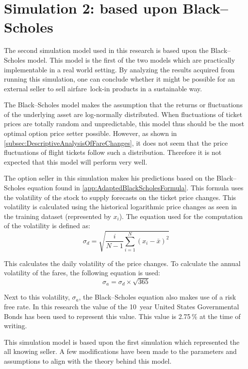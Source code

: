 

\section{Simulation 2: based upon Black--Scholes}
The second simulation model used in this research is based upon the Black--Scholes model. This model is the first of the two models which are practically implementable in a real world setting. By analyzing the results acquired from running this simulation, one can conclude whether it might be possible for an external seller to sell airfare~lock-in products in a sustainable way.

The Black--Scholes model makes the assumption that the returns or fluctuations of the underlying asset are log-normally distributed. When fluctuations of ticket prices are totally random and unpredictable, this model thus should be the most optimal option price setter possible. However, as shown in \autoref{subsec:DescriptiveAnalysisOfFareChanges}, it does not seem that the price fluctuations of flight tickets follow such a distribution. Therefore it is not expected that this model will perform very well.

The option seller in this simulation makes his predictions based on the Black--Scholes equation found in \autoref{app:AdaptedBlackScholesFormula}. This formula uses the volatility of the stock to supply forecasts on the ticket price changes. This volatility is calculated using the historical logarithmic price changes as seen in the training dataset (represented by $x_i$). The equation used for the computation of the volatility is defined as:
$$\sigma_d = \sqrt{\frac{i}{N-1}\sum_{i=1}^N(x_i - \bar{x})^2} $$

This calculates the daily volatility of the price changes. To calculate the annual volatility of the fares, the following equation is used:
$$\sigma_a = \sigma_d \times \sqrt{365} $$

Next to this volatility, $\sigma_a$, the Black--Scholes equation also makes use of a risk free rate. In this research the value of the 10~year United States Governmental Bonds has been used to represent this value. This value is 2.75\,\% at the time of writing.

This simulation model is based upon the first simulation which represented the all knowing seller. A few modifications have been made to the parameters and assumptions to align with the theory behind this model.

